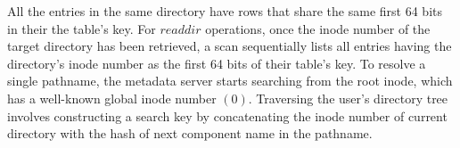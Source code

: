 All the entries in the same directory have rows that 
share the same first 64 bits in their the table's key.
For $readdir$ operations, once the inode number
of the target directory has been retrieved, 
a scan sequentially lists all entries having 
the directory's inode number as the first 64 bits of their table's key. 
To resolve a single pathname, the metadata server starts searching from the root inode, 
which has a well-known global inode number $(0)$.
Traversing the user's directory tree
involves constructing a search key by concatenating the inode 
number of current directory with the hash of
next component name in the pathname.
